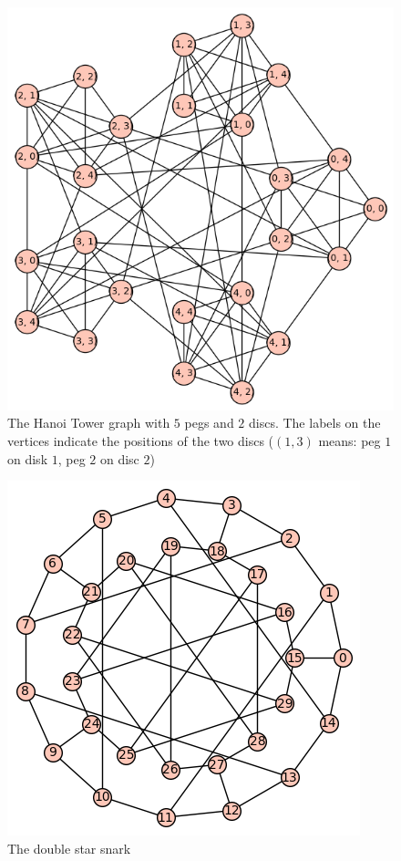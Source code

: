 \documentclass[paper=a4, fontsize=11pt]{scrartcl} %
\begin{document}
\begin{figure}[htbp]
   \centering
   \includegraphics{ht} %
   \caption{The Hanoi Tower graph with $5$ pegs and $2$ discs. The labels on the vertices indicate the positions of the two discs ($(1,3)$ means: peg $1$ on disk $1$, peg $2$ on disc $2$)}
   \label{ht}
\end{figure}
\begin{figure}[htbp]
   \centering
   \includegraphics{dss} %
   \caption{The double star snark}
   \label{dss}
\end{figure}
\end{document}
